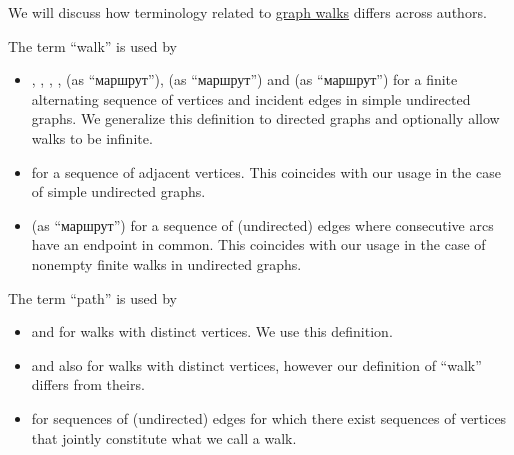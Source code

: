 \begin{remark}\label{rem:graph_walk_terminology}
  We will discuss how terminology related to \hyperref[def:graph_walk]{graph walks} differs across authors.

  \begin{thmenum}
     The term \enquote{walk} is used by
    \begin{itemize}
      \item {}, , , ,  (as \enquote{маршрут}),  (as \enquote{маршрут}) and  (as \enquote{маршрут}) for a finite alternating sequence of vertices and incident edges in simple undirected graphs. We generalize this definition to directed graphs and optionally allow walks to be infinite.

      \item {} for a sequence of adjacent vertices. This coincides with our usage in the case of simple undirected graphs.

      \item {} (as \enquote{маршрут}) for a sequence of (undirected) edges where consecutive arcs have an endpoint in common. This coincides with our usage in the case of nonempty finite walks in undirected graphs.
    \end{itemize}

     The term \enquote{path} is used by
    \begin{itemize}
      \item {} and  for walks with distinct vertices. We use this definition.

      \item {} and  also for walks with distinct vertices, however our definition of \enquote{walk} differs from theirs.

      \item {} for sequences of (undirected) edges for which there exist sequences of vertices that jointly constitute what we call a walk.


\end{itemize}
\end{thmenum}
\end{remark}
